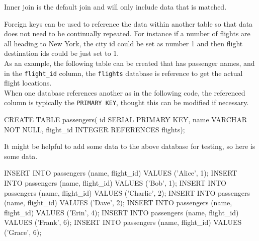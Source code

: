 \documentclass[]{book}
\newenvironment{Shaded}{\begin{snugshade}}{\end{snugshade}}
\newcommand{\StringTok}[1]{\textcolor[rgb]{0.31,0.60,0.02}{#1}}
\newcommand{\FunctionTok}[1]{\textcolor[rgb]{0.00,0.00,0.00}{#1}}
\newcommand{\ExtensionTok}[1]{#1}
\newcommand{\NormalTok}[1]{#1}
\begin{document}
Inner join is the default join and will only include data that is
matched.

Foreign keys can be used to reference the data within another table so
that data does not need to be continually repeated. For instance if a
number of flights are all heading to New York, the city id could be set
as number 1 and then flight destination ids could be just set to 1.\\
As an example, the following table can be created that has passenger
names, and in the \texttt{flight\_id} column, the \texttt{flights}
database is reference to get the actual flight locations.\\
When one database references another as in the following code, the
referenced column is typically the \texttt{PRIMARY\ KEY}, thought this
can be modified if necessary.

\begin{Shaded}
\begin{Highlighting}[]
\ExtensionTok{CREATE}\NormalTok{ TABLE passengers(}
    \FunctionTok{id}\NormalTok{ SERIAL PRIMARY KEY,}
    \ExtensionTok{name}\NormalTok{ VARCHAR NOT NULL,}
    \ExtensionTok{flight_id}\NormalTok{ INTEGER REFERENCES flights);}
\end{Highlighting}
\end{Shaded}

It might be helpful to add some data to the above database for testing,
so here is some data.

\begin{Shaded}
\begin{Highlighting}[]
\ExtensionTok{INSERT}\NormalTok{ INTO passengers (name, flight_id) }\ExtensionTok{VALUES}\NormalTok{ (}\StringTok{'Alice'}\NormalTok{, 1);  }
\ExtensionTok{INSERT}\NormalTok{ INTO passengers (name, flight_id) }\ExtensionTok{VALUES}\NormalTok{ (}\StringTok{'Bob'}\NormalTok{, 1);    }
\ExtensionTok{INSERT}\NormalTok{ INTO passengers (name, flight_id) }\ExtensionTok{VALUES}\NormalTok{ (}\StringTok{'Charlie'}\NormalTok{, 2);}
\ExtensionTok{INSERT}\NormalTok{ INTO passengers (name, flight_id) }\ExtensionTok{VALUES}\NormalTok{ (}\StringTok{'Dave'}\NormalTok{, 2);   }
\ExtensionTok{INSERT}\NormalTok{ INTO passengers (name, flight_id) }\ExtensionTok{VALUES}\NormalTok{ (}\StringTok{'Erin'}\NormalTok{, 4);   }
\ExtensionTok{INSERT}\NormalTok{ INTO passengers (name, flight_id) }\ExtensionTok{VALUES}\NormalTok{ (}\StringTok{'Frank'}\NormalTok{, 6);  }
\ExtensionTok{INSERT}\NormalTok{ INTO passengers (name, flight_id) }\ExtensionTok{VALUES}\NormalTok{ (}\StringTok{'Grace'}\NormalTok{, 6);  }
\end{Highlighting}
\end{Shaded}
\end{document}
